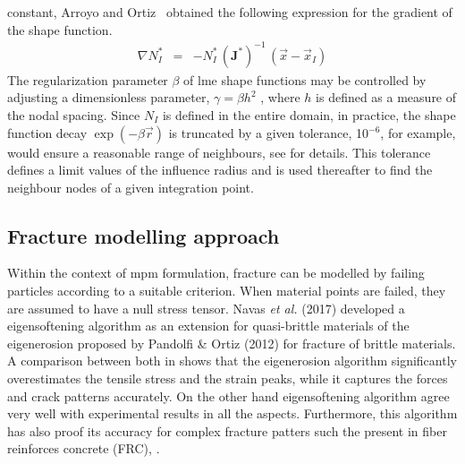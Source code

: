 \documentclass[preprint,12pt,a4paper]{elsarticle}
\newcommand{\tens}[1]{
  \ensuremath{\mathbf{{#1}}}
}
\begin{document}
constant, Arroyo and Ortiz~\cite{Arroyo2006} obtained the following
expression for the gradient of the shape function.
\begin{eqnarray}
  \label{eq:LME-gradp} 
\nabla N^*_I &=& -N^*_I \,  (\tens{J}^*)^{-1} \,  (\vec{x} - \vec{x}_I)
\end{eqnarray}
The regularization parameter $\beta$ of \acrshort{lme} shape functions may be
controlled by adjusting a dimensionless parameter, $\gamma=\beta h^2$
\cite{Arroyo2006}, where $h$ is defined as a measure of the nodal
spacing. Since $N_I$ is defined in the entire domain, in practice,
the shape function decay $\exp(-\beta \vec{r} )$ is truncated  by  a
given tolerance, 10$^{-6}$, for example, would ensure a reasonable
range of neighbours, see \cite{Arroyo2006} for details. This tolerance defines
a limit values of the influence radius and is used thereafter to
find the neighbour nodes of a given integration point.

\subsection{Fracture modelling approach}
\label{sec:2.3}
Within the context of \acrshort{mpm} formulation, fracture can be modelled by
failing particles according to a suitable criterion. When material
points are failed, they are assumed to have a null stress
tensor. Navas {\it et al.} (2017)\cite{Navas_2017_ES} developed a
eigensoftening algorithm as an extension for quasi-brittle materials
of the eigenerosion proposed by Pandolfi \& Ortiz
(2012)\cite{Pandolfi_2012} for fracture of brittle materials. A
comparison between both in \cite{Navas_2017_ES} shows that
the eigenerosion algorithm significantly overestimates the tensile
stress and the strain peaks, while it captures the forces and crack
patterns accurately. On the other hand eigensoftening algorithm agree
very well with experimental results in all the aspects. Furthermore,
this algorithm has also proof its accuracy for complex fracture
patters such the present in fiber reinforces concrete (FRC),
\cite{Navas_2018_ES}.\\
\end{document}
